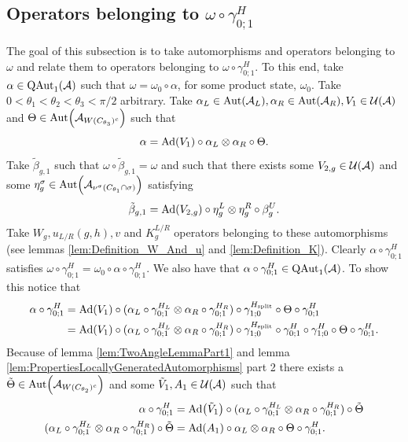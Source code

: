 \documentclass[11pt,a4paper,twoside]{article}
\numberwithin{equation}{section}
\begin{document}
	\subsection{Operators belonging to $\omega\circ\gamma^H_{0;1}$}
	The goal of this subsection is to take automorphisms and operators belonging to $\omega$ and relate them to operators belonging to $\omega\circ\gamma^H_{0;1}$. To this end, take $\alpha\in\QAut{\AA}$ such that $\omega=\omega_0\circ\alpha$, for some product state, $\omega_0$. Take $0<\theta_1<\theta_2<\theta_3<\pi/2$ arbitrary. Take $\alpha_L\in\Aut{\AA_L},\alpha_R\in\Aut{\AA_R},V_1\in\UU(\AA)$ and $\Theta\in\Aut{\AA_{W(C_{\theta_3})^c}}$ such that
	\begin{equation}
		\alpha=\Ad{V_1}\circ\alpha_L\otimes\alpha_R\circ\Theta.
	\end{equation}
	Take $\tilde{\beta}_{g,1}$ such that $\omega\circ\tilde{\beta}_{g,1}=\omega$ and such that there exists some $V_{2,g}\in\mathcal U(\mathcal A)$ and some $\eta_g^{\sigma}\in\Aut{\AA_{\nu^\sigma(C_{\theta_1}\cap \sigma)}}$ satisfying
	\begin{equation}
		\tilde{\beta}_{g,1}=\Ad{V_{2,g}}\circ\eta_{g}^L\otimes\eta_{g}^R\circ\beta_g^U.
	\end{equation}
	Take $W_g,u_{L/R}(g,h),v$ and $K_g^{L/R}$ operators belonging to these automorphisms (see lemmas \ref{lem:Definition_W_And_u} and \ref{lem:Definition_K}). Clearly $\alpha\circ\gamma^H_{0;1}$ satisfies $\omega\circ\gamma^{H}_{0;1}=\omega_0\circ\alpha\circ\gamma^{H}_{0;1}$. We also have that $\alpha\circ\gamma^{H}_{0;1}\in\QAut{\AA}$. To show this notice that
	\begin{align}
		\alpha\circ\gamma^{H}_{0;1}&=\Ad{V_1}\circ(\alpha_L\circ\gamma^{H_L}_{0;1}\otimes\alpha_R\circ\gamma^{H_R}_{0;1})\circ\gamma^{\Hsplit}_{1;0}\circ\Theta\circ\gamma^H_{0;1}\\
		&=\Ad{V_1}\circ(\alpha_L\circ\gamma^{H_L}_{0;1}\otimes\alpha_R\circ\gamma^{H_R}_{0;1})\circ\gamma^{\Hsplit}_{1;0}\circ\gamma^{H}_{0;1}\circ\gamma^{H}_{1;0}\circ\Theta\circ\gamma^H_{0;1}.
	\end{align}
	Because of lemma \ref{lem:TwoAngleLemmaPart1} and lemma \ref{lem:PropertiesLocallyGeneratedAutomorphisms} part 2 there exists a $\tilde{\Theta}\in\Aut{\AA_{W(C_{\theta_2})^c}}$ and some $\tilde V_1,A_1\in\mathcal U(\mathcal A)$ such that
	\begin{align}
		\alpha\circ\gamma^H_{0;1}&=\Ad{\tilde V_1}\circ(\alpha_L\circ\gamma^{H_L}_{0;1}\otimes\alpha_R\circ\gamma^{H_R}_{0;1})\circ\tilde\Theta\\
		\label{eq:ProofThatTheH2IndexIsInvariantUnderLGA's_Definition_A1}
		(\alpha_L\circ\gamma^{H_L}_{0;1}\otimes\alpha_R\circ\gamma^{H_R}_{0;1})\circ\tilde\Theta&=\Ad{A_1}\circ \alpha_L\otimes\alpha_R\circ\Theta\circ\gamma^{H}_{0;1}.
	\end{align}
\end{document}
